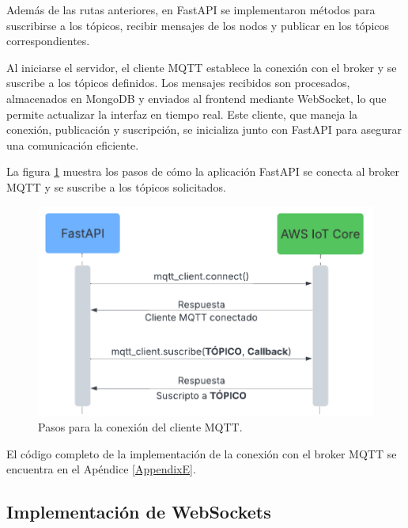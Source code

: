 Además de las rutas anteriores, en FastAPI se implementaron métodos para
suscribirse a los tópicos, recibir mensajes de los nodos y publicar en los
tópicos correspondientes.

Al iniciarse el servidor, el cliente MQTT establece la conexión con el broker y
se suscribe a los tópicos definidos. Los mensajes recibidos son procesados,
almacenados en MongoDB y enviados al frontend mediante WebSocket, lo que
permite actualizar la interfaz en tiempo real. Este cliente, que maneja la
conexión, publicación y suscripción, se inicializa junto con FastAPI para
asegurar una comunicación eficiente.

La figura \ref{fig:cliente_mqtt} muestra los pasos de cómo la aplicación
FastAPI se conecta al broker MQTT y se suscribe a los tópicos solicitados.

\begin{figure}[H]
    \centering
    \includegraphics[width=.60\textwidth]{./Images/22.png}
    \caption{Pasos para la conexión del cliente MQTT.}
    \label{fig:cliente_mqtt}
\end{figure}



El código completo de la implementación de la conexión con el broker MQTT se
encuentra en el Apéndice \ref{AppendixE}.

\subsection{Implementación de WebSockets}

